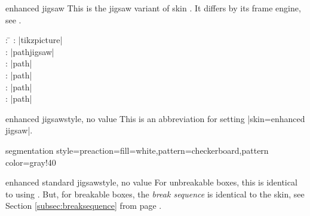 \begin{dispExample}
\end{dispExample}

\clearpage

\begin{docSkin}{enhanced jigsaw}
  This is the jigsaw variant of skin .
  It differs by its frame engine, see .
\begin{tcolorbox}[skintable=enhanced jigsaw]
  \begin{tabbing}
    : \=\kill
    :  \> |tikzpicture|\\ 
    :           \> |pathjigsaw|\\
    : \> |path|\\ 
    :        \> |path|\\
    :    \> |path|\\
    :           \> |path|
  \end{tabbing}
\end{tcolorbox}
\end{docSkin}

\begin{docTcbKey}{enhanced jigsaw}{}{style, no value}
  This is an abbreviation for setting |skin=enhanced jigsaw|.
\end{docTcbKey}


\begin{dispExample*}{segmentation style={preaction={fill=white},pattern=checkerboard,pattern color=gray!40}}
\end{dispExample*}


\begin{docTcbKey}[][doc new=2017-07-01]{enhanced standard jigsaw}{}{style, no value}
  For unbreakable boxes, this is identical to using .
  But, for breakable boxes, the \emph{break sequence} is identical to the  skin,
  see Section \ref{subsec:breaksequence} from page \pageref{subsec:breaksequence}.
\end{docTcbKey}


